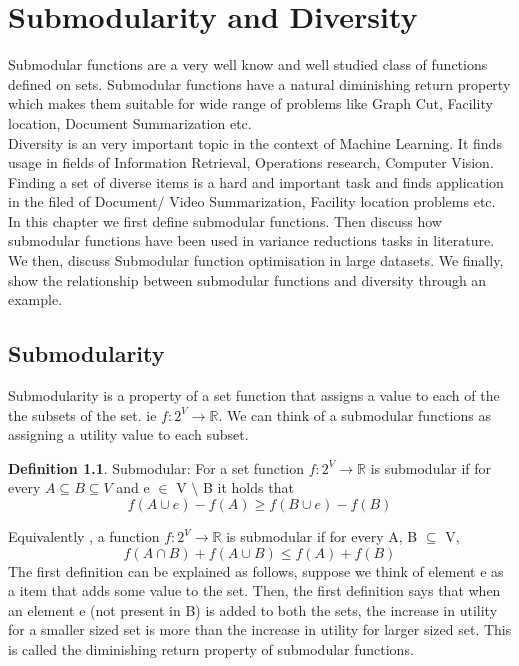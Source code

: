 \documentclass[a4paper,twoside]{iiththesis}
\theoremstyle{definition}
\newtheorem{definition}{Definition}[section]
\theoremstyle{definition}
\theoremstyle{remark}
\begin{document}
\chapter{Submodularity and Diversity }

Submodular functions are a very well know and well studied class of functions defined on sets. Submodular functions have a natural diminishing return property which makes them suitable for wide range of problems like Graph Cut, Facility location, Document Summarization etc. \\
Diversity is an very important topic in the context of Machine Learning. It finds usage in fields of Information Retrieval, Operations research,  Computer Vision. Finding a set of diverse items is a hard and important task and finds application in the filed of Document/ Video Summarization, Facility location problems etc. \\
In this chapter we first define submodular functions. Then discuss how submodular functions have been used in variance reductions tasks in literature. We then, discuss Submodular function optimisation in large datasets. We finally, show the relationship between submodular functions and diversity through an example.

\section{Submodularity}

Submodularity is a property of a set function that assigns a value to each of the the subsets of the set. ie  $ f: 2^V \rightarrow \mathbb{R}$. We can think of a submodular functions as assigning a utility value to each subset.
\theoremstyle{definition}
\begin{definition}{Submodular:}
For a set function $ f: 2^V \rightarrow \mathbb{R}$ is submodular if for every $ A \subseteq B \subseteq V $ and e $\in$ V $\setminus$ B it holds that 
\begin{equation}
			f(A \cup e) - f(A) \geq f(B \cup e) - f(B)
\end{equation}
\end{definition}
Equivalently , a function $ f: 2^V \rightarrow \mathbb{R}$  is submodular if for every A, B $\subseteq$ V, 
\begin{equation}
f(A\cap B) + f(A \cup B) \leq f(A) + f(B)
\end{equation}
The first definition can be explained as follows, suppose we think of element e as a item that adds some value to the set. Then, the first definition says that when an element e (not present in B) is added to both the sets, the increase in utility for a smaller sized set is more than the increase in utility for larger sized set. This is called the diminishing return property of submodular functions.
\\
\end{document}
